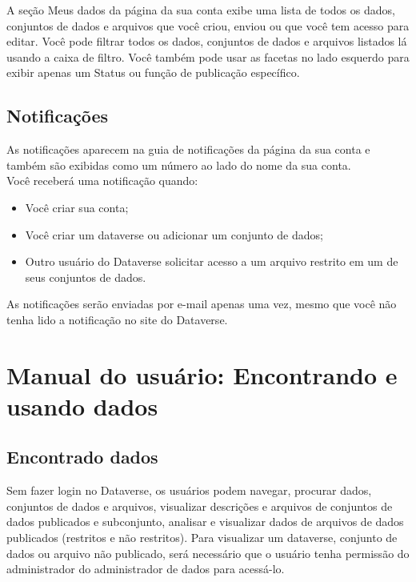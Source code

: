 \documentclass[12pt,hidelinks]{article}
\begin{document}
\qquad A seção Meus dados da página da sua conta exibe uma lista de todos os dados, conjuntos de dados e arquivos que você criou, enviou ou que você tem acesso para editar. Você pode filtrar todos os dados, conjuntos de dados e arquivos listados lá usando a caixa de filtro. Você também pode usar as facetas no lado esquerdo para exibir apenas um Status ou função de publicação específico.
     	
    \subsection{Notificações}
     	
\qquad As notificações aparecem na guia de notificações da página da sua conta e também são exibidas como um número ao lado do nome da sua conta.\\

Você receberá uma notificação quando:

\begin{itemize} 
\item Você criar sua conta;
\item Você criar um dataverse ou adicionar um conjunto de dados;
\item Outro usuário do Dataverse solicitar acesso a um arquivo restrito em um de seus conjuntos de dados.
\end{itemize}	

As notificações serão enviadas por e-mail apenas uma vez, mesmo que você não tenha lido a notificação no site do Dataverse.

\newpage
     	
\section{Manual do usuário: Encontrando e usando dados}
\vspace{10.5cm}

	\subsection{Encontrado dados}
	
\qquad Sem fazer login no Dataverse, os usuários podem navegar, procurar dados, conjuntos de dados e arquivos, visualizar descrições e arquivos de conjuntos de dados publicados e subconjunto, analisar e visualizar dados de arquivos de dados publicados (restritos e não restritos). Para visualizar um dataverse, conjunto de dados ou arquivo não publicado, será necessário que o usuário tenha permissão do administrador do administrador de dados para acessá-lo.
\end{document}
